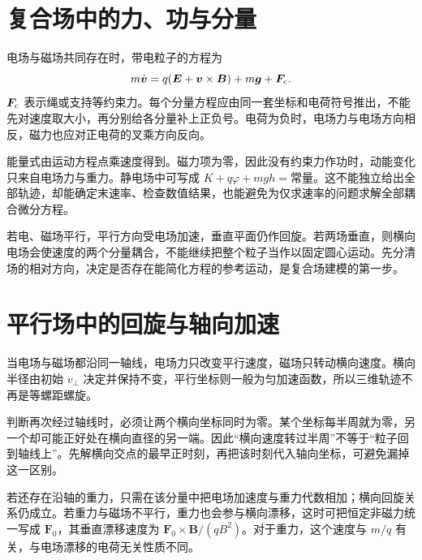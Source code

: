 \section{复合场中的力、功与分量}
电场与磁场共同存在时，带电粒子的方程为
\begin{equation}m\dot{\bm v}=q(\bm E+\bm v\times\bm B)+m\bm g+\bm F_{\rm c}.\end{equation}
$\bm F_{\rm c}$ 表示绳或支持等约束力。每个分量方程应由同一套坐标和电荷符号推出，不能先对速度取大小，再分别给各分量补上正负号。电荷为负时，电场力与电场方向相反，磁力也应对正电荷的叉乘方向反向。


能量式由运动方程点乘速度得到。磁力项为零，因此没有约束力作功时，动能变化只来自电场力与重力。静电场中可写成 $K+q\varphi+mgh=\text{常量}$。这不能独立给出全部轨迹，却能确定末速率、检查数值结果，也能避免为仅求速率的问题求解全部耦合微分方程。


若电、磁场平行，平行方向受电场加速，垂直平面仍作回旋。若两场垂直，则横向电场会使速度的两个分量耦合，不能继续把整个粒子当作以固定圆心运动。先分清场的相对方向，决定是否存在能简化方程的参考运动，是复合场建模的第一步。

\section{平行场中的回旋与轴向加速}
当电场与磁场都沿同一轴线，电场力只改变平行速度，磁场只转动横向速度。横向半径由初始 $v_\perp$ 决定并保持不变，平行坐标则一般为匀加速函数，所以三维轨迹不再是等螺距螺旋。


判断再次经过轴线时，必须让两个横向坐标同时为零。某个坐标每半周就为零，另一个却可能正好处在横向直径的另一端。因此“横向速度转过半周”不等于“粒子回到轴线上”。先解横向交点的最早正时刻，再把该时刻代入轴向坐标，可避免漏掉这一区别。


若还存在沿轴的重力，只需在该分量中把电场加速度与重力代数相加；横向回旋关系仍成立。若重力与磁场不平行，重力也会参与横向漂移，这时可把恒定非磁力统一写成 $\bm F_0$，其垂直漂移速度为 $\bm F_0\times\bm B/(qB^2)$。对于重力，这个速度与 $m/q$ 有关，与电场漂移的电荷无关性质不同。

